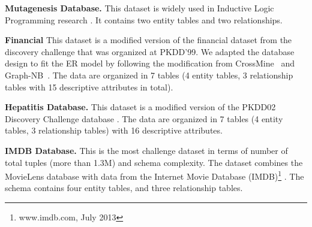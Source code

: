 \documentclass{vldb}
\begin{document}
\noindent\textbf{Mutagenesis Database.}  This dataset is widely used in Inductive Logic Programming research \cite{Srinivasan1996}. %
It contains two entity tables and two relationships.

\noindent\textbf{Financial} 
This dataset is a modified version of the financial dataset from the discovery challenge that was organized at PKDD'99. We adapted the database design to fit the ER model by following the modification from CrossMine~\cite{Yin2004} and Graph-NB~\cite{han2009}. The data are organized in 7 tables (4 entity tables, 3 relationship tables with 15 descriptive attributes in total).

\noindent\textbf{Hepatitis Database.} This dataset is a modified version of the PKDD02 Discovery Challenge database \cite{Frank2007}. %
The data are organized in 7 tables (4 entity tables,  3 relationship tables) with 16 descriptive attributes. 

\noindent\textbf{IMDB Database.} %
This is the most challenge dataset in terms of number of total tuples (more than 1.3M)
and schema complexity. %
The dataset combines the MovieLens database with data from the Internet Movie Database (IMDB)\footnote{www.imdb.com, July 2013} \cite{Peralta2007}.
The schema contains four entity tables, and three relationship tables.
\end{document}
